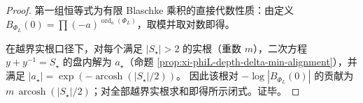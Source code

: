 \begin{proof}
第一组恒等式为有限 Blaschke 乘积的直接代数性质：由定义 \(B_{\Phi_L}(0)=\prod (-a)^{\operatorname{ord}_a(\Phi_L)}\)，取模并取对数即得。
\par
在越界实根口径下，对每个满足 \(|S_\star|>2\) 的实根（重数 \(m\)），二次方程 \(y+y^{-1}=S_\star\) 的盘内解为 \(a_\star\)（命题 \ref{prop:xi-phiL-depth-delta-min-alignment}），并满足
\(
|a_\star|=\exp(-\operatorname{arcosh}(|S_\star|/2))
\)。
因此该根对 \(-\log|B_{\Phi_L}(0)|\) 的贡献为 \(m\,\operatorname{arcosh}(|S_\star|/2)\)；对全部越界实根求和即得所示闭式。证毕。
\end{proof}

\endinput
